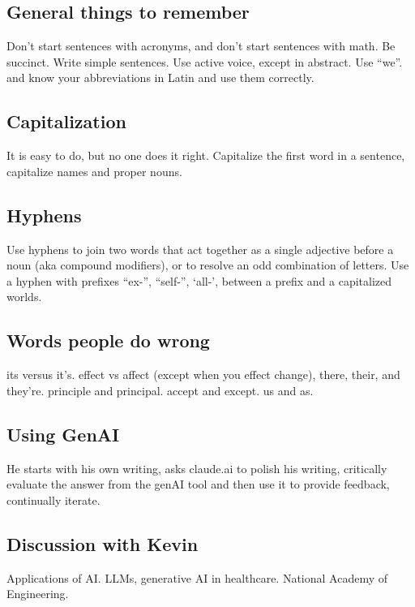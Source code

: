 \documentclass[10pt, oneside]{article}
\begin{document}
\subsection{General things to remember}
Don't start sentences with acronyms, and don't start sentences with math. Be succinct. Write simple sentences. Use active voice, except in abstract. Use ``we''. and know your abbreviations in Latin and use them correctly. 

\subsection{Capitalization}
It is easy to do, but no one does it right. Capitalize the first word in a sentence, capitalize names and proper nouns. 
\subsection{Hyphens}
Use hyphens to join two words that act together as a single adjective before a noun (aka compound modifiers), or to resolve an odd combination of letters. Use a hyphen with prefixes ``ex-'', ``self-'', `all-', between a prefix and a capitalized worlds. 

\subsection{Words people do wrong}
its versus it's. effect vs affect (except when you effect change), there, their, and they're. principle and principal. accept and except. us and as. 


\subsection{Using GenAI}
He starts with his own writing, asks claude.ai to polish his writing, critically evaluate the answer from the genAI tool and then use it to provide feedback, continually iterate. 

\subsection{Discussion with Kevin}
Applications of AI. LLMs, generative AI in healthcare. National Academy of Engineering.
\end{document}
